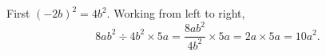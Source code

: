 First $(-2b)^2=4b^2$. Working from left to right,
\[
8ab^2\div4b^2\times5a=\dfrac{8ab^2}{4b^2}\times5a=2a\times5a=\boxed{10a^2}.
\]
